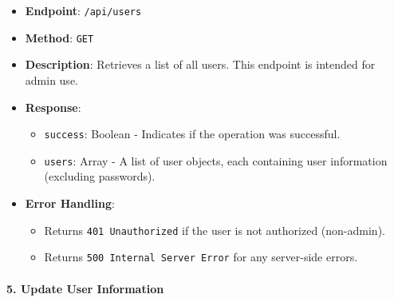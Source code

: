 \begin{itemize}
\tightlist
\item
  \textbf{Endpoint}: \texttt{/api/users}
\item
  \textbf{Method}: \texttt{GET}
\item
  \textbf{Description}: Retrieves a list of all users. This endpoint is
  intended for admin use.
\item
  \textbf{Response}:

  \begin{itemize}
  \tightlist
  \item
    \texttt{success}: Boolean - Indicates if the operation was
    successful.
  \item
    \texttt{users}: Array - A list of user objects, each containing user
    information (excluding passwords).
  \end{itemize}
\item
  \textbf{Error Handling}:

  \begin{itemize}
  \tightlist
  \item
    Returns \texttt{401\ Unauthorized} if the user is not authorized
    (non-admin).
  \item
    Returns \texttt{500\ Internal\ Server\ Error} for any server-side
    errors.
  \end{itemize}
\end{itemize}

\hypertarget{update-user-information}{%
\paragraph{5. Update User Information}\label{update-user-information}}

